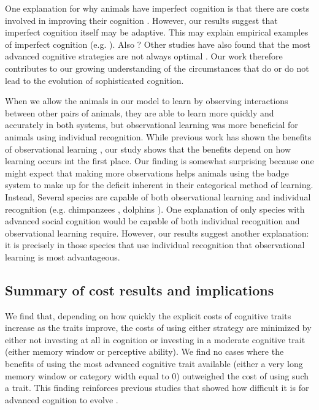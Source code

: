 One explanation for why animals have imperfect cognition is that there are costs involved in improving their cognition \cite{Gavrilets:2006fk}. However, our results suggest that imperfect cognition itself may be adaptive. This may explain empirical examples of imperfect cognition (e.g. \cite{Kikuchi:2010ys}). Also \cite{Stoddard:2011zr}?
Other studies have also found that the most advanced cognitive strategies are not always optimal \cite{Brush:2016kx,Kerr:2003vn,Dunlap:2009vn,Stephens:1991fk}. Our work therefore contributes to our growing understanding of the circumstances that do or do not lead to the evolution of sophisticated cognition.

When we allow the animals in our model to learn by observing interactions between other pairs of animals, they are able to learn more quickly and accurately in both systems, but observational learning was more beneficial for animals using individual recognition. While previous work has shown the benefits of observational learning \cite{Schaik:2011oq,Holekamp:1991nx,Freeman:1985kl}, our study shows that the benefits depend on how learning occurs int the first place. Our finding is somewhat surprising because one might expect that making more observations helps animals using the badge system to make up for the deficit inherent in their categorical method of learning. Instead, Several species are capable of both observational learning and individual recognition (e.g. chimpanzees \cite{Parr:2000hc,Hopper:2008bh}, dolphins \cite{Krutzen:2005ij,Sayigh:1999bs}). One explanation of only species with advanced social cognition would be capable of both individual recognition and observational learning require. However, our results suggest another explanation: it is precisely in those species that use individual recognition that observational learning is most advantageous.

\subsection*{Summary of cost results and implications} %
We find that, depending on how quickly the explicit costs of cognitive traits increase as the traits improve, the costs of using either strategy are minimized by either not investing at all in cognition or investing in a moderate cognitive trait (either memory window or perceptive ability). We find no cases where the benefits of using the most advanced cognitive trait available (either a very long memory window or category width equal to $0$) outweighed the cost of using such a trait. This finding reinforces previous studies that showed how difficult it is for advanced cognition to evolve \cite{Kerr:2003vn}.



